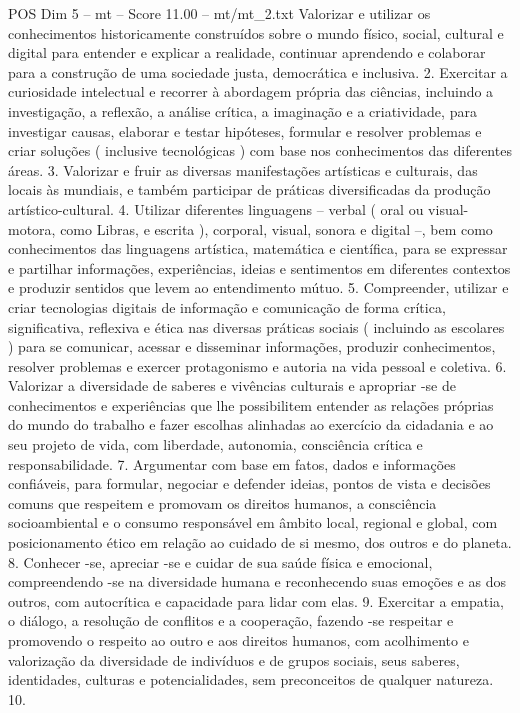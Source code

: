 \begin{textsample}{POS Dim 5 – mt – Score 11.00 – mt/mt\_2.txt}
Valorizar e utilizar os conhecimentos historicamente construídos sobre o mundo físico, social, cultural e digital para entender e explicar a realidade, continuar aprendendo e colaborar para a construção de uma sociedade justa, democrática e inclusiva. 2.
Exercitar a curiosidade intelectual e recorrer à abordagem própria das ciências, incluindo a investigação, a reflexão, a análise crítica, a imaginação e a criatividade, para investigar causas, elaborar e testar hipóteses, formular e resolver problemas e criar soluções ( inclusive tecnológicas ) com base nos conhecimentos das diferentes áreas. 3.
Valorizar e fruir as diversas manifestações artísticas e culturais, das locais às mundiais, e também participar de práticas diversificadas da produção artístico-cultural. 4.
Utilizar diferentes linguagens – verbal ( oral ou visual-motora, como Libras, e escrita ), corporal, visual, sonora e digital –, bem como conhecimentos das linguagens artística, matemática e científica, para se expressar e partilhar informações, experiências, ideias e sentimentos em diferentes contextos e produzir sentidos que levem ao entendimento mútuo. 5.
Compreender, utilizar e criar tecnologias digitais de informação e comunicação de forma crítica, significativa, reflexiva e ética nas diversas práticas sociais ( incluindo as escolares ) para se comunicar, acessar e disseminar informações, produzir conhecimentos, resolver problemas e exercer protagonismo e autoria na vida pessoal e coletiva. 6.
Valorizar a diversidade de saberes e vivências culturais e apropriar -se de conhecimentos e experiências que lhe possibilitem entender as relações próprias do mundo do trabalho e fazer escolhas alinhadas ao exercício da cidadania e ao seu projeto de vida, com liberdade, autonomia, consciência crítica e responsabilidade. 7.
Argumentar com base em fatos, dados e informações confiáveis, para formular, negociar e defender ideias, pontos de vista e decisões comuns que respeitem e promovam os direitos humanos, a consciência socioambiental e o consumo responsável em âmbito local, regional e global, com posicionamento ético em relação ao cuidado de si mesmo, dos outros e do planeta. 8.
Conhecer -se, apreciar -se e cuidar de sua saúde física e emocional, compreendendo -se na diversidade humana e reconhecendo suas emoções e as dos outros, com autocrítica e capacidade para lidar com elas. 9.
Exercitar a empatia, o diálogo, a resolução de conflitos e a cooperação, fazendo -se respeitar e promovendo o respeito ao outro e aos direitos humanos, com acolhimento e valorização da diversidade de indivíduos e de grupos sociais, seus saberes, identidades, culturas e potencialidades, sem preconceitos de qualquer natureza. 10.

\end{textsample}
